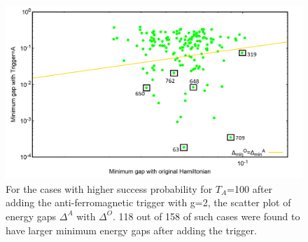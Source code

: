 \documentclass[../main.tex]{subfiles}
\begin{document}
\begin{figure}[H]
\centering 
\includegraphics[scale=0.3]{selected_T100_g2.png}
\caption{For the cases with higher success probability for $T_A$=100 after adding the anti-ferromagnetic trigger with g=2, the scatter plot of energy gaps $\Delta^A $ with $\Delta^O$. 118 out of 158 of such cases were found to have larger minimum energy gaps after adding the trigger.}
\label{fig:a44}
\end{figure}
\end{document}
